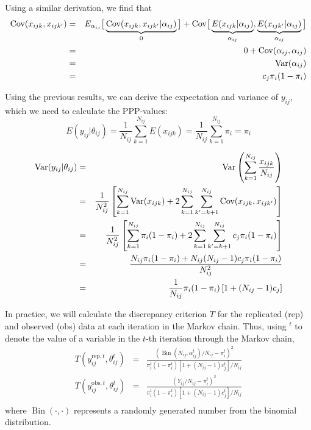 \documentclass[a4paper,12pt]{article}
\begin{document}
Using a similar derivation, we find that
\begin{eqnarray*}
\text{Cov}(x_{ijk},x_{ijk^\prime})
&=& E_{{\alpha_{ij}}}\big[
\underbrace{\text{Cov}(x_{ijk},x_{ijk^\prime}|{\alpha_{ij}})}_0
\big]
+
\text{Cov}\big[
\underbrace{E(x_{ijk}|{\alpha_{ij}})}_{\alpha_{ij}},
\underbrace{E(x_{ijk^\prime}|{\alpha_{ij}})}_{\alpha_{ij}}
\big]\\
&=& 0 + \text{Cov}({\alpha_{ij}},{\alpha_{ij}})\\
&=& \text{Var}({\alpha_{ij}})\\
&=& c_j \pi_i(1-\pi_i)
\end{eqnarray*}

Using the previous results, we can derive the expectation and variance
of $y_{ij}$, which we need to calculate the PPP-values:
$$
E(y_{ij}|\theta_{ij}) = 
\frac 1 {N_{ij}} \sum_{k=1}^{N_{ij}} E(x_{ijk}) = 
\frac 1 {N_{ij}} \sum_{k=1}^{N_{ij}} \pi_i = 
\pi_i
$$

\begin{eqnarray*}
  \operatorname{Var}(y_{ij}|\theta_{ij}) &=&
  \text{Var}\left(\sum_{k=1}^{N_{ij}} \frac{x_{ijk}}{N_{ij}} \right)\\
  &=&
  \frac{ 1 }{N_{ij}^2}\left[
    \sum_{k=1}^{N_{ij}} \text{Var}(x_{ijk}) +
    2\sum_{k=1}^{N_{ij}} \sum_{k^\prime=k+1}^{N_{ij}} \text{Cov}(x_{ijk},x_{ijk^\prime}) 
\right]\\
  &=&
  \frac{ 1 }{N_{ij}^2}\left[
    \sum_{k=1}^{N_{ij}} \pi_i(1-\pi_i) +
    2\sum_{k=1}^{N_{ij}} \sum_{k^\prime=k+1}^{N_{ij}} c_j\pi_i(1-\pi_i) 
\right]\\
  &=&
  \frac{
    N_{ij} \pi_i(1-\pi_i) +
    N_{ij}(N_{ij}-1) c_j\pi_i(1-\pi_i) 
  }{N_{ij}^2}\\
  &=&
  \frac 1 {N_{ij}} \pi_i(1-\pi_i)
  \left[1+(N_{ij}-1)c_j\right]
\end{eqnarray*}
\renewcommand{\Bin}{\operatorname{Bin}}

In practice, we will calculate the discrepancy criterion $T$ for the
replicated (rep) and observed (obs) data at each iteration in the
Markov chain. Thus, using $^t$ to denote the value of a variable in
the $t$-th iteration through the Markov chain,
\begin{eqnarray*}
  T(y_{ij}^{\text{rep},t},\theta_{ij}^t) &=&
  \frac{\left(\Bin(N_{ij},\alpha_{ij}^t)/N_{ij} - \pi_i^t\right)^2}{
  \pi^t_i(1-\pi^t_i) \left[1+(N_{ij}-1)c^t_j\right]/N_{ij}}\\    
  T(y_{ij}^{\text{obs},t},\theta_{ij}^t) &=&
  \frac{\left(Y_{ij}/N_{ij} - \pi_i^t\right)^2}{
  \pi^t_i(1-\pi^t_i) \left[1+(N_{ij}-1)c^t_j\right]/N_{ij}}\\
\end{eqnarray*}
where $\Bin(\cdot,\cdot)$ represents a randomly generated number from
the binomial distribution.
\end{document}
